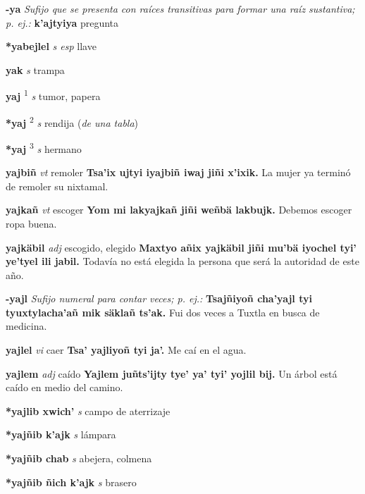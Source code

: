 \documentclass[10pt]{scrbook}
\newcommand{\entry}[1]{\textbf{#1}}
\newcommand{\alphaletter}[1]{\end{multicols}\addsec{#1}\begin{multicols}{2}}
\newcommand{\defsuperscript}[1]{\textsuperscript{#1}}
\newcommand{\nontranslationdef}[1]{\textit{#1}}
\newcommand{\partofspeech}[1]{\textit{#1}}
\newcommand{\spanishtranslation}[1]{#1}
\newcommand{\clarification}[1]{(\textit{#1})}
\newcommand{\cholexample}[1]{\textbf{#1}}
\newcommand{\exampletranslation}[1]{#1}
\begin{document}
\begin{multicols}{2}
\alphaletter{Y}

\entry{-ya}
\nontranslationdef{Sufijo que se presenta con raíces transitivas para formar una raíz sustantiva; p. ej.:}
\cholexample{k'ajtyiya}
\exampletranslation{pregunta}

\entry{*yabejlel}
\partofspeech{s esp}
\spanishtranslation{llave}

\entry{yak}
\partofspeech{s}
\spanishtranslation{trampa}

\entry{yaj}
\defsuperscript{1}
\partofspeech{s}
\spanishtranslation{tumor, papera}

\entry{*yaj}
\defsuperscript{2}
\partofspeech{s}
\spanishtranslation{rendija}
\clarification{de una tabla}

\entry{*yaj}
\defsuperscript{3}
\partofspeech{s}
\spanishtranslation{hermano}

\entry{yajbiñ}
\partofspeech{vt}
\spanishtranslation{remoler}
\cholexample{Tsa'ix ujtyi iyajbiñ iwaj jiñi x'ixik.}
\exampletranslation{La mujer ya terminó de remoler su nixtamal.}

\entry{yajkañ}
\partofspeech{vt}
\spanishtranslation{escoger}
\cholexample{Yom mi lakyajkañ jiñi weñbä lakbujk.}
\exampletranslation{Debemos escoger ropa buena.}

\entry{yajkäbil}
\partofspeech{adj}
\spanishtranslation{escogido, elegido}
\cholexample{Maxtyo añix yajkäbil jiñi mu'bä iyochel tyi' ye'tyel ili jabil.}
\exampletranslation{Todavía no está elegida la persona que será la autoridad de este año.}

\entry{-yajl}
\nontranslationdef{Sufijo numeral para contar veces; p. ej.:}
\cholexample{Tsajñiyoñ cha'yajl tyi tyuxtylacha'añ mik säklañ ts'ak.}
\exampletranslation{Fui dos veces a Tuxtla en busca de medicina.}

\entry{yajlel}
\partofspeech{vi}
\spanishtranslation{caer}
\cholexample{Tsa' yajliyoñ tyi ja'.}
\exampletranslation{Me caí en el agua.}

\entry{yajlem}
\partofspeech{adj}
\spanishtranslation{caído}
\cholexample{Yajlem juñts'ijty tye' ya' tyi' yojlil bij.}
\exampletranslation{Un árbol está caído en medio del camino.}

\entry{*yajlib xwich'}
\partofspeech{s}
\spanishtranslation{campo de aterrizaje}

\entry{*yajñib k'ajk}
\partofspeech{s}
\spanishtranslation{lámpara}

\entry{*yajñib chab}
\partofspeech{s}
\spanishtranslation{abejera, colmena}

\entry{*yajñib ñich k'ajk}
\partofspeech{s}
\spanishtranslation{brasero}


\end{multicols}
\end{document}
